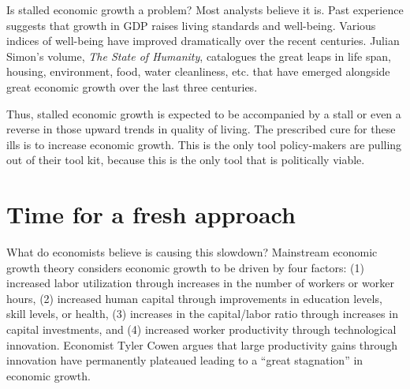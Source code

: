 
Is stalled economic growth a problem? Most analysts believe it is. Past experience suggests that growth in GDP raises living standards and well-being. Various indices of well-being have improved dramatically over the recent centuries. Julian Simon's
volume, \emph{The State of Humanity}, catalogues the great leaps in life span, housing, environment, food, water cleanliness, etc. that have emerged alongside great economic growth over the last three centuries.\cite{simon1996} 

Thus, stalled economic growth is expected to be accompanied by a stall or even a reverse in those upward trends in quality of living. The prescribed cure for these ills is to increase economic growth. This is the only tool policy-makers are pulling 
out of their tool kit, because this is the only tool that is politically viable. 


\section{ Time for a fresh approach}%
\label{sec:fresh_approach}

What do economists believe is causing this slowdown? Mainstream economic growth theory considers economic growth to be driven by four factors: (1) increased labor utilization through increases in the number of workers or worker hours, (2) increased human capital through improvements in education levels, skill levels, or health, (3) increases in the capital/labor ratio through increases in capital investments, and (4) increased worker productivity through technological innovation. Economist Tyler Cowen argues that large productivity gains through innovation have permanently plateaued leading to a ``great stagnation'' in economic growth.\cite{Cowen2011}


